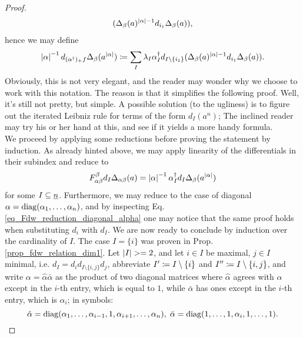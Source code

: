 \begin{cor}
\begin{proof}
\begin{gather*}
      (\Delta_{\beta}(a)^{\abs{\alpha}-1} d_{i_1} \Delta_{\beta}(a)),%
  \end{gather*}
  hence we may define
  \begin{equation*}
    \abs{\alpha}^{-1} d_{(\alpha^\dagger)_+ f} \Delta_{\beta}(a^{\abs{\alpha}}) \defas %
    \sum_I \lambda_I \alpha^\dagger_I d_{I \setminus \{i_1\}}
      (\Delta_{\beta}(a)^{\abs{\alpha}-1} d_{i_1} \Delta_{\beta}(a)).
  \end{equation*}
  Obviously, this is not very elegant, and the reader may wonder why we choose to work with this notation. The reason is that it simplifies the following proof. Well, it's still not pretty, but simple. A possible solution (to the ugliness) is to figure out the iterated Leibniz rule for terms of the form $d_I (a^n)$; The inclined reader may try his or her hand at this, and see if it yields a more handy formula. \\
  We proceed by applying some reductions before proving the statement by induction. As already hinted above, we may apply linearity of the differentials in their subindex and reduce to
  \begin{equation*}
    F_{\alpha\beta}^\beta d_I \Delta_{\alpha\beta} (a) =%
    \abs{\alpha}^{-1}\alpha^\dagger_I d_I \Delta_{\beta}(a^{\abs{\alpha}})%
  \end{equation*}
  for some $I \subseteq \underline{n}$. Furthermore, we may reduce to the case of diagonal $\alpha = \mathrm{diag}(\alpha_1, \ldots, \alpha_n)$, and by inspecting Eq. \ref{eq_Fdw_reduction_diagonal_alpha} one may notice that the same proof holds when substituting $d_i$ with $d_I$. We are now ready to conclude by induction over the cardinality of $I$. The case $I = \{i\}$ was proven in Prop. \ref{prop_fdw_relation_dim1}. Let $\left\vert I\right\vert >= 2$, and let $i \in I$ be maximal, $j\in I$ minimal, i.e. $d_I = d_i d_{I \setminus \{i,j\}} d_j$, abbreviate $I^\prime \coloneqq I \setminus \{i\}$ and $I^{\prime\prime} \coloneqq I \setminus \{i,j\}$, and write $\alpha = \hat \alpha \bar \alpha$ as the product of two diagonal matrices where $\hat \alpha$ agrees with $\alpha$ except in the $i$-th entry, which is equal to $1$, while $\bar \alpha$ has ones except in the $i$-th entry, which is $\alpha_i$; in symbols:
  \begin{equation*}
    \hat \alpha = \diag(\alpha_1, \ldots, \alpha_{i-1}, 1, \alpha_{i+1}, \ldots, \alpha_n),\;%
      \bar \alpha = \diag(1,\ldots,1,\alpha_i,1,\ldots,1).

\end{equation*}
\end{proof}
\end{cor}
